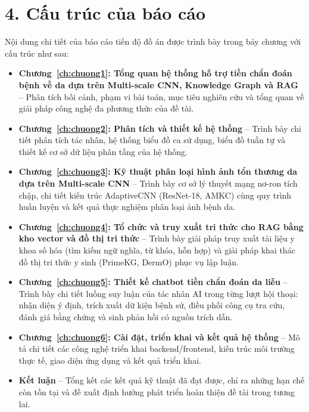 \section*{4. Cấu trúc của báo cáo}

Nội dung chi tiết của báo cáo tiến độ đồ án được trình bày trong bảy chương với cấu trúc như sau:

\begin{itemize}
  \item \textbf{Chương~\ref{ch:chuong1}: Tổng quan hệ thống hỗ trợ tiền chẩn đoán bệnh về da dựa trên Multi-scale CNN, Knowledge Graph và RAG} -- Phân tích bối cảnh, phạm vi bài toán, mục tiêu nghiên cứu và tổng quan về giải pháp công nghệ đa phương thức của đề tài.
  \item \textbf{Chương~\ref{ch:chuong2}: Phân tích và thiết kế hệ thống} -- Trình bày chi tiết phân tích tác nhân, hệ thống biểu đồ ca sử dụng, biểu đồ tuần tự và thiết kế cơ sở dữ liệu phân tầng của hệ thống.
  \item \textbf{Chương~\ref{ch:chuong3}: Kỹ thuật phân loại hình ảnh tổn thương da dựa trên Multi-scale CNN} -- Trình bày cơ sở lý thuyết mạng nơ-ron tích chập, chi tiết kiến trúc AdaptiveCNN (ResNet-18, AMKC) cùng quy trình huấn luyện và kết quả thực nghiệm phân loại ảnh bệnh da.
  \item \textbf{Chương~\ref{ch:chuong4}: Tổ chức và truy xuất tri thức cho RAG bằng kho vector và đồ thị tri thức} -- Trình bày giải pháp truy xuất tài liệu y khoa số hóa (tìm kiếm ngữ nghĩa, từ khóa, hỗn hợp) và giải pháp khai thác đồ thị tri thức y sinh (PrimeKG, DermO) phục vụ lập luận.
  \item \textbf{Chương~\ref{ch:chuong5}: Thiết kế chatbot tiền chẩn đoán da liễu} -- Trình bày chi tiết luồng suy luận của tác nhân AI trong từng lượt hội thoại: nhận diện ý định, trích xuất dữ kiện bệnh sử, điều phối công cụ tra cứu, đánh giá bằng chứng và sinh phản hồi có nguồn trích dẫn.
  \item \textbf{Chương~\ref{ch:chuong6}: Cài đặt, triển khai và kết quả hệ thống} -- Mô tả chi tiết các công nghệ triển khai backend/frontend, kiến trúc môi trường thực tế, giao diện ứng dụng và kết quả triển khai.
  \item \textbf{Kết luận} -- Tổng kết các kết quả kỹ thuật đã đạt được, chỉ ra những hạn chế còn tồn tại và đề xuất định hướng phát triển hoàn thiện đề tài trong tương lai.
\end{itemize}
